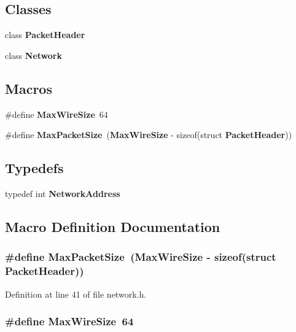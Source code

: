 \subsection*{Classes}
\begin{DoxyCompactItemize}
\item 
class {\bf Packet\+Header}
\item 
class {\bf Network}
\end{DoxyCompactItemize}
\subsection*{Macros}
\begin{DoxyCompactItemize}
\item 
\#define {\bf Max\+Wire\+Size}~64
\item 
\#define {\bf Max\+Packet\+Size}~({\bf Max\+Wire\+Size} -\/ sizeof(struct {\bf Packet\+Header}))
\end{DoxyCompactItemize}
\subsection*{Typedefs}
\begin{DoxyCompactItemize}
\item 
typedef int {\bf Network\+Address}
\end{DoxyCompactItemize}


\subsection{Macro Definition Documentation}
\subsubsection[{Max\+Packet\+Size}]{\setlength{\rightskip}{0pt plus 5cm}\#define Max\+Packet\+Size~({\bf Max\+Wire\+Size} -\/ sizeof(struct {\bf Packet\+Header}))}\label{network_8h_a13aa348efea7645f4ee794cfa0521335}


Definition at line 41 of file network.\+h.

\subsubsection[{Max\+Wire\+Size}]{\setlength{\rightskip}{0pt plus 5cm}\#define Max\+Wire\+Size~64}\label{network_8h_a26d25e38e0b52ca3712c41301030d9a5}


